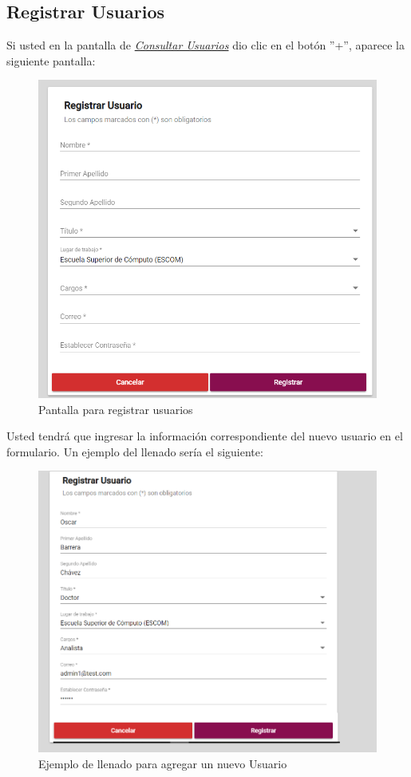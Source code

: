     \newpage
        \hypertarget{registrarUs}{}
        \subsection{Registrar Usuarios}
            Si usted  en la pantalla de \hyperlink{consultarUs}{\textit{Consultar Usuarios}} dio clic en el botón ''+'', aparece la siguiente pantalla:

            \begin{figure}[!hbtp]
                \centering
                \hypertarget{registrarUs}{\includegraphics[width=0.7\linewidth]{images/SP5/Registro-Usuario-vacio}}
                \caption{Pantalla para registrar usuarios}
                \label{registrarrh}
            \end{figure}

            Usted tendrá que ingresar la información correspondiente del nuevo usuario en el formulario. Un ejemplo del llenado  sería el siguiente:

            \begin{figure}[!hbtp]
                \centering
                \hypertarget{ejreg}{\includegraphics[width=0.7\linewidth]{images/SP5/Registro-Usuario-UA}}
                \caption{Ejemplo de llenado para agregar un nuevo Usuario}
                \label{ejreg}
            \end{figure}

